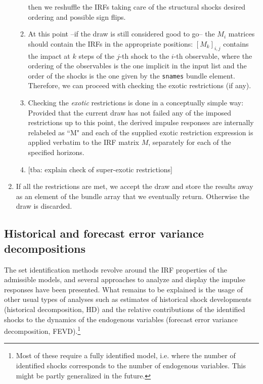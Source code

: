 \documentclass[a4paper,10pt]{article}
\begin{document}
\begin{enumerate}
\begin{enumerate}
      then we reshuffle the IRFs taking care of the structural shocks
      desired ordering and possible sign flips. 
    \item At this point --if the draw is still considered good to go-- the 
      $M_i$ matrices should contain the IRFs in
      the appropriate positions: $[M_k]_{i,j}$ contains the impact at
      $k$ steps of the $j$-th shock to the $i$-th observable, where
      the ordering of the observables is the one implicit in the input
      list and the order of the shocks is the one given by the
      \texttt{snames} bundle element. Therefore, we can proceed with
      checking the exotic restrictions (if any).
    \item Checking the \emph{exotic} restrictions is done in a conceptually
      simple way: Provided that the current draw has not failed any of the 
      imposed restrictions up to this point, the derived impulse responses are 
      internally relabeled as ``M" and each of the supplied exotic restriction 
      expression is applied
      verbatim to the IRF matrix $M$, separately for each of the specified horizons.
    \item{} [tba: explain check of super-exotic restrictions]  
      
    \end{enumerate}
  \item If all the restrictions are met, we accept the draw and store the
    results away as an element of the bundle array that we eventually
    return. Otherwise the draw is discarded.
\end{enumerate}

\subsection{Historical and forecast error variance decompositions}

The set identification methods revolve around the IRF properties of the 
admissible models, and several approaches to analyze and display the 
impulse responses have been presented. What remains to be explained 
is the usage of other usual types of analyses such as estimates of historical
shock developments (historical decomposition, HD) and the relative contributions
of the identified shocks to the dynamics of the endogenous variables (forecast
error variance decomposition, FEVD).\footnote{Most of these require a fully
identified model, i.e. where the number of identified shocks corresponds to
the number of endogenous variables. This might be partly generalized in the
future.}
\end{document}
